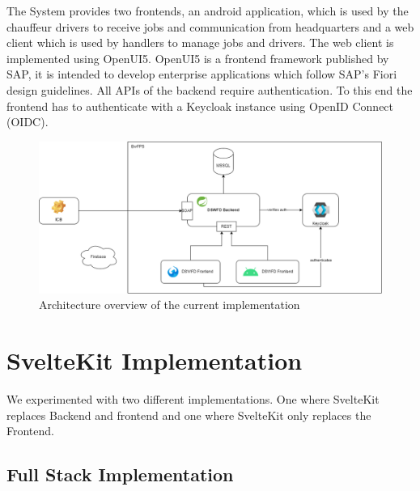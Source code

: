The System provides two frontends, an android application, which is used by the chauffeur drivers to receive jobs and communication from headquarters and a web client which is used by handlers to manage jobs and drivers. The web client is implemented using OpenUI5. OpenUI5 is a frontend framework published by SAP, it is intended to develop enterprise applications which follow SAP's Fiori design guidelines. All APIs of the backend require authentication. To this end the frontend has to authenticate with a Keycloak instance using OpenID Connect (OIDC).

\begin{figure}[ht]
    \centering
    \includegraphics[width=.8\linewidth]{assets/dswfd-architecture}
    \caption{Architecture overview of the current implementation}
    \label{fig:dswfd-architecture}
\end{figure}

\section{SvelteKit Implementation}


We experimented with two different implementations. One where SvelteKit replaces Backend and frontend and one where SvelteKit only replaces the Frontend.

\subsection{Full Stack Implementation}


